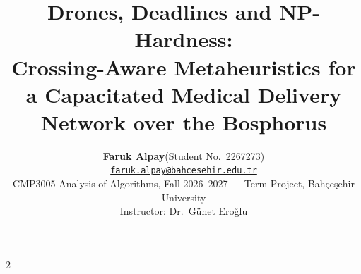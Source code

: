 \documentclass[10pt,a4paper]{article}
\title{\vspace{-1.2cm}\sffamily\bfseries Drones, Deadlines and NP-Hardness:\\[2pt]
\large Crossing-Aware Metaheuristics for a Capacitated Medical Delivery Network over the Bosphorus}
\author{\textbf{Faruk Alpay}\quad (Student No.\ 2267273)\\
\small \href{mailto:faruk.alpay@bahcesehir.edu.tr}{\texttt{faruk.alpay@bahcesehir.edu.tr}}\\
\small CMP3005 Analysis of Algorithms, Fall 2026--2027 --- Term Project, Bah\c{c}e\c{s}ehir University\\
\small Instructor: Dr.\ G\"unet Ero\u{g}lu}
\date{}
\begin{document}
\maketitle
\thispagestyle{fancy}











\begin{multicols}{2}
{\footnotesize\setlength{\bibsep}{0.8pt}}
\end{multicols}

\clearpage
\appendix

\end{document}
